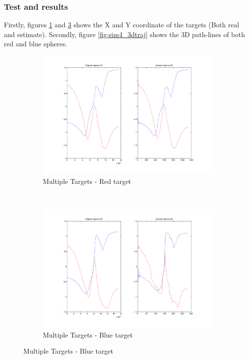 \subsubsection{Test and results}

	Firstly, figures \ref{fig:sim4_redtarget} and \ref{fig:sim4_bluetarget} shows the X and Y coordinate of the targets (Both real and estimate). Secondly, figure \ref{fig:sim4_3dtraj} shows the 3D path-lines of both red and blue spheres. \\
	
	\begin{figure}[hp]
		\centering
		\begin{subfigure}[hp]{0.45\linewidth}
			\centering
			\includegraphics[width=\linewidth]{../Images/c3/sim4_redtarget}
			\caption{Multiple Targets - Red target}
			\label{fig:sim4_redtarget}	
		\end{subfigure}
		~
		\begin{subfigure}[hp]{0.45\linewidth}
			\centering
			\includegraphics[width=\linewidth]{../Images/c3/sim4_bluetarget}
			\caption{Multiple Targets - Blue target}
			\label{fig:sim4_bluetarget}
		\end{subfigure}
	\end{figure}
	
